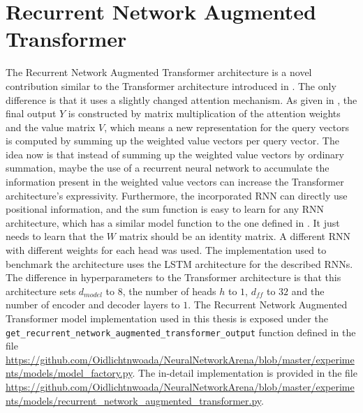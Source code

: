 \documentclass[draft,final]{vutinfth} %
\begin{document}
    \section{Recurrent Network Augmented Transformer} \label{rnaut}
    The Recurrent Network Augmented Transformer architecture is a novel contribution similar to the Transformer architecture introduced in \cite{Transformer}.
    The only difference is that it uses a slightly changed attention mechanism.
    As given in , the final output $Y$ is constructed by matrix multiplication of the attention weights and the value matrix $V$, which means a new representation for the query vectors is computed by summing up the weighted value vectors per query vector.
    The idea now is that instead of summing up the weighted value vectors by ordinary summation, maybe the use of a recurrent neural network to accumulate the information present in the weighted value vectors can increase the Transformer architecture's expressivity.
    Furthermore, the incorporated RNN can directly use positional information, and the sum function is easy to learn for any RNN architecture, which has a similar model function to the one defined in .
    It just needs to learn that the $W$ matrix should be an identity matrix.
    A different RNN with different weights for each head was used.
    The implementation used to benchmark the architecture uses the LSTM architecture for the described RNNs.
    The difference in hyperparameters to the Transformer architecture is that this architecture sets $d_{model}$ to $8$, the number of heads $h$ to $1$, $d_{ff}$ to $32$ and the number of encoder and decoder layers to $1$.
    The Recurrent Network Augmented Transformer model implementation used in this thesis is exposed under the \texttt{get\_recurrent\_network\_augmented\_transformer\_output} function defined in the file \url{https://github.com/Oidlichtnwoada/NeuralNetworkArena/blob/master/experiments/models/model_factory.py}.
    The in-detail implementation is provided in the file \url{https://github.com/Oidlichtnwoada/NeuralNetworkArena/blob/master/experiments/models/recurrent_network_augmented_transformer.py}.
\end{document}
